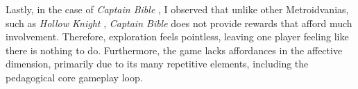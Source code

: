 Lastly, in the case of \textit{Captain Bible} \parencite{engelbrite_captain_1994}, I observed that unlike other Metroidvanias, such as \textit{Hollow Knight} \parencite{team_cherry_hollow_2017}, \textit{Captain Bible} does not provide rewards that afford much involvement. Therefore, exploration feels pointless, leaving one player feeling like there is nothing to do. Furthermore, the game lacks affordances in the affective dimension, primarily due to its many repetitive elements, including the pedagogical core gameplay loop.

